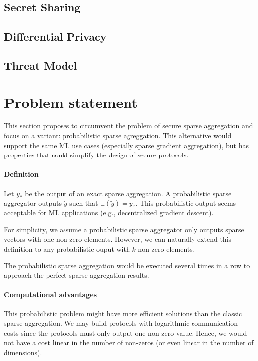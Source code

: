 \documentclass[sigconf,balance=false]{acmart}
\begin{document}
\subsection{Secret Sharing}

\subsection{Differential Privacy}

\subsection{Threat Model}

\section{Problem statement}

This section proposes to circumvent the problem of secure sparse aggregation and focus on a variant: probabilistic sparse agreggation.
This alternative would support the same ML use cases (especially sparse gradient aggregation), but has properties that could simplify the design of secure protocols.

\paragraph{Definition}

Let $y_*$ be the output of an exact sparse aggregation. A probabilistic sparse aggregator outputs $\widetilde{y}$ such that $\mathbb{E}(\widetilde{y}) = y_*$.
This probabilistic output seems acceptable for ML applications (e.g., decentralized gradient descent).

For simplicity, we assume a probabilistic sparse aggregator only outputs sparse vectors with one non-zero elements.
However, we can naturally extend this definition to any probabilistic ouput with $k$ non-zero elements.

The probabilistic sparse aggregation would be executed several times in a row to approach the perfect sparse aggregation results.

\paragraph{Computational advantages}
This probabilistic problem might have more efficient solutions than the classic sparse aggregation.
We may build protocols with logarithmic communication costs since the protocols must only output one non-zero value.
Hence, we would not have a cost linear in the number of non-zeros (or even linear in the number of dimensions).
\end{document}

